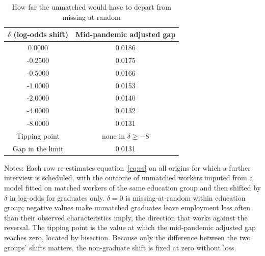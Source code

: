 \begin{table}[H]
\centering
\caption{How far the unmatched would have to depart from missing-at-random}
\label{tab:tipping}
\begin{threeparttable}
\begin{tabular}{cc}
\toprule
$\delta$ (log-odds shift) & Mid-pandemic adjusted gap \\
\midrule
0.0000 & 0.0186 \\
-0.2500 & 0.0175 \\
-0.5000 & 0.0166 \\
-1.0000 & 0.0153 \\
-2.0000 & 0.0140 \\
-4.0000 & 0.0132 \\
-8.0000 & 0.0131 \\
\midrule
Tipping point & none in $\delta \geq -8$ \\
Gap in the limit & 0.0131 \\
\bottomrule
\end{tabular}
\begin{tablenotes}[flushleft]\footnotesize
\item Notes: Each row re-estimates equation~\eqref{eq:es} on all origins for which a further interview is scheduled, with the outcome of unmatched workers imputed from a model fitted on matched workers of the same education group and then shifted by $\delta$ in log-odds for graduates only. $\delta = 0$ is missing-at-random within education group; negative values make unmatched graduates leave employment less often than their observed characteristics imply, the direction that works against the reversal. The tipping point is the value at which the mid-pandemic adjusted gap reaches zero, located by bisection. Because only the difference between the two groups' shifts matters, the non-graduate shift is fixed at zero without loss.
\end{tablenotes}
\end{threeparttable}
\end{table}
